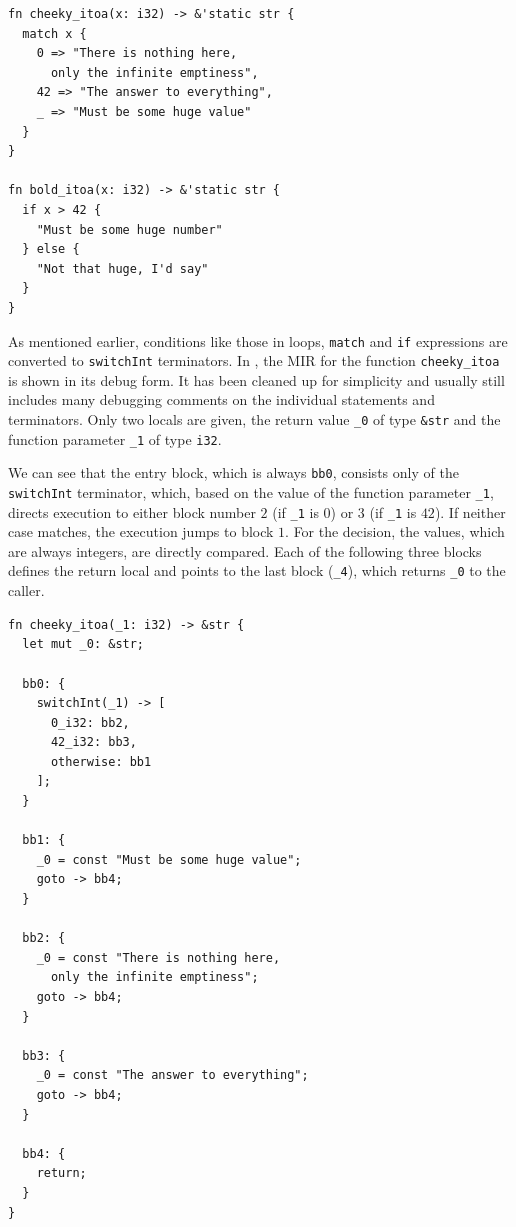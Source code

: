 \documentclass[paper=a4,%
  twoside,%
  BCOR4mm,%
  abstract=true,%
  toc=bibliography,%
  chapterprefix=true,%
  toc=bibliographynumbered,%
  open=right,%
  english,%
  pagesize=pdftex]{scrreprt}
\newcommand{\mir}{\ac{MIR}\xspace}
\begin{document}
\begin{lstlisting}[style=boxed, caption={HIR of the code in \Cref{lst:hir-lowering}}, label=lst:mir-lowering]
fn cheeky_itoa(x: i32) -> &'static str {
  match x {
    0 => "There is nothing here, 
      only the infinite emptiness",
    42 => "The answer to everything",
    _ => "Must be some huge value"
  }
}

fn bold_itoa(x: i32) -> &'static str {
  if x > 42 {
    "Must be some huge number"
  } else {
    "Not that huge, I'd say"
  }
}
\end{lstlisting}

As mentioned earlier, conditions like those in loops, \texttt{match} and \texttt{if} expressions are converted to \texttt{switchInt} terminators. In , the \mir for the function \texttt{cheeky\string_itoa} is shown in its debug form. It has been cleaned up for simplicity and usually still includes many debugging comments on the individual statements and terminators. Only two locals are given, the return value \texttt{\string_0} of type \texttt{\string&str} 
and the function parameter \texttt{\string_1} of type \texttt{i32}.

We can see that the entry block, which is always \texttt{bb0}, consists only of the \texttt{switchInt} terminator, which, based on the value of the function parameter \texttt{\string_1}, directs execution to either block number $2$ (if \texttt{\string_1} is $0$) or $3$ (if \texttt{\string_1} is $42$). If neither case matches, the execution jumps to block $1$. For the decision, the values, which are always integers, are directly compared. Each of the following three blocks defines the return local and points to the last block (\texttt{\string_4}), which returns \texttt{\string_0} to the caller. 

\begin{lstlisting}[style=boxed, caption={\mir of the \texttt{cheeky\string_itoa} function}, label=lst:mir-lowered-first]
fn cheeky_itoa(_1: i32) -> &str {
  let mut _0: &str;

  bb0: {
    switchInt(_1) -> [
      0_i32: bb2, 
      42_i32: bb3, 
      otherwise: bb1
    ]; 
  }

  bb1: {
    _0 = const "Must be some huge value"; 
    goto -> bb4;                  
  }

  bb2: {
    _0 = const "There is nothing here, 
      only the infinite emptiness"; 
    goto -> bb4;                   
  }

  bb3: {
    _0 = const "The answer to everything";
    goto -> bb4; 
  }

  bb4: {
    return;
  }
}
\end{lstlisting}
\end{document}
